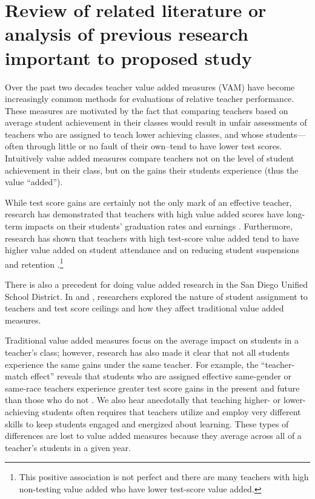 \documentclass[letterpaper,12pt]{article}
\begin{document}
\section{Review of related literature or analysis of previous research important to proposed study}
Over the past two decades teacher value added measures (VAM) have become increasingly common methods for evaluations of relative teacher performance. These measures are motivated by the fact that comparing teachers based on average student achievement in their classes would result in unfair assessments of teachers who are assigned to teach lower achieving classes, and whose students---often through little or no fault of their own--tend to have lower test scores. Intuitively value added measures compare teachers not on the level of student achievement in their class, but on the gains their students experience (thus the value ``added'').

While test score gains are certainly not the only mark of an effective teacher, research has demonstrated that teachers with high value added scores have long-term impacts on their students' graduation rates and earnings \citep{chetty2014measuring2}. Furthermore, research has shown that teachers with high test-score value added tend to have higher value added on student attendance and on reducing student suspensions and retention \citep{pope2017multidimensional}.\footnote{This positive association is not perfect and there are many teachers with high non-testing value added who have lower test-score value added.} 

There is also a precedent for doing value added research in the San Diego Unified School District. In \citet{koedel2010value} and \citet{koedel2011does}, researchers explored the nature of student assignment to teachers and test score ceilings and how they affect traditional value added measures.

Traditional value added measures focus on the average impact on students in a teacher's class; however, research has also made it clear that not all students experience the same gains under the same teacher. For example, the ``teacher-match effect'' reveals that students who are assigned effective same-gender or same-race teachers experience greater test score gains in the present and future than those who do not \citep{dee2005teacher,delhommer2019highschool}. We also hear anecdotally that teaching higher- or lower-achieving students often requires that teachers utilize and employ very different skills to keep students engaged and energized about learning. These types of differences are lost to value added measures because they average across all of a teacher's students in a given year.
\end{document}
